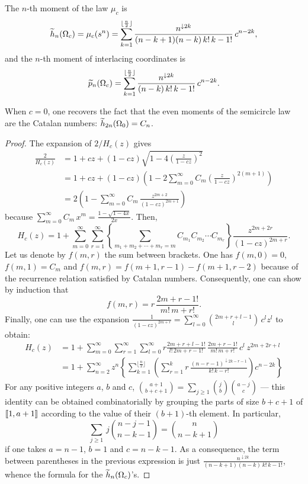 \documentclass[10pt]{amsart}
\begin{document}
\begin{proposition}\label{obslimitshape}
The $n$-th moment of the law $\mu_{c}$ is
$$\widetilde{h}_{n}(\Omega_{c})=\mu_{c}(s^{n})=\sum_{k=1}^{\lfloor \frac{n}{2}\rfloor} \frac{n^{\downarrow 2k}}{(n-k+1)(n-k)\,k!\,k-1!}\,c^{n-2k},$$
and the $n$-th moment of interlacing coordinates is
$$\widetilde{p}_{n}(\Omega_{c})=\sum_{k=1}^{\lfloor \frac{n}{2}\rfloor} \frac{n^{\downarrow 2k}}{(n-k)\,k!\,k-1!}\,c^{n-2k}.$$
\end{proposition} 
\noindent When $c=0$, one recovers the fact that the even moments of the semicircle law are the Catalan numbers: $\widetilde{h}_{2n}(\Omega_{0})=C_{n}$.
\begin{proof}
The expansion of $2/H_{c}(z)$ gives
\begin{align*}
\frac{2}{H_{c}(z)}&=1+cz+(1-cz)\sqrt{1-4\left(\frac{z}{1-cz}\right)^{2}}\\
&=1+cz+(1-cz)\left(1-2\sum_{m=0}^{\infty}C_{m}\left(\frac{z}{1-cz}\right)^{2(m+1)}\right)\\
&=2\left(1-\sum_{m=0}^{\infty}C_{m}\,\frac{z^{2m+2}}{(1-cz)^{2m+1}}\right)
\end{align*}
because $\sum_{m=0}^{\infty}C_{m}\,x^{m}=\frac{1-\sqrt{1-4x}}{2x}$. Then,
$$H_{c}(z)=1+\sum_{m=0}^{\infty}\sum_{r=1}^{\infty}\left\{\sum_{m_{1}+m_{2}+\cdots+m_{r}=m}\!\!\!\!\! C_{m_{1}}C_{m_{2}}\cdots C_{m_{r}}\right\}\frac{z^{2m+2r}}{(1-cz)^{2m+r}}.
$$
Let us denote by $f(m,r)$ the sum between brackets. One has $f(m,0)=0$, $f(m,1)=C_{m}$ and $f(m,r)=f(m+1,r-1)-f(m+1,r-2)$ because of the recurrence relation satisfied by Catalan numbers. Consequently, one can show by induction that
$$f(m,r)=r\,\frac{2m+r-1!}{m!\,m+r!}.$$
Finally, one can use the expansion $\frac{1}{(1-cz)^{2m+r}}=\sum_{l=0}^{\infty} \binom{2m+r+l-1}{l}\,c^{l}z^{l}$ to obtain:
\begin{align*}H_{c}(z)&=1+\sum_{m=0}^{\infty}\sum_{r=1}^{\infty}\sum_{l=0}^{\infty} r\frac{2m+r+l-1!}{l!\,2m+r-1!}\,\frac{2m+r-1!}{m!\,m+r!}\,c^{l}\,z^{2m+2r+l}\\
&=1+\sum_{n=2}^{\infty}z^{n}\left\{\sum_{k=1}^{\lfloor \frac{n}{2}\rfloor }\left(\sum_{r=1}^{k}r\, \frac{(n-r-1)^{\downarrow 2k-r-1}}{k!\,k-r!}\right)c^{n-2k}\right\}
\end{align*}
For any positive integers $a$, $b$ and $c$, $\binom{a+1}{b+c+1}=\sum_{j\geq 1} \binom{j}{b}\binom{a-j}{c}$ --- this identity can be obtained combinatorially by grouping the parts of size $b+c+1$ of $\left[\!\left[ 1,a+1\right]\!\right]$ according to the value of their $(b+1)$-th element. In particular,
$$\sum_{j\geq 1}\,j\binom{n-j-1}{n-k-1}=\binom{n}{n-k+1}$$
if one takes $a=n-1$, $b=1$ and $c=n-k-1$. As a consequence, the term between parentheses in the previous expression is just $\frac{n^{\downarrow 2k}}{(n-k+1)(n-k)\,k!\,k-1!}$, whence the formula for the $\widetilde{h}_{n}(\Omega_{c})$'s.\bigskip


\end{proof}
\end{document}
